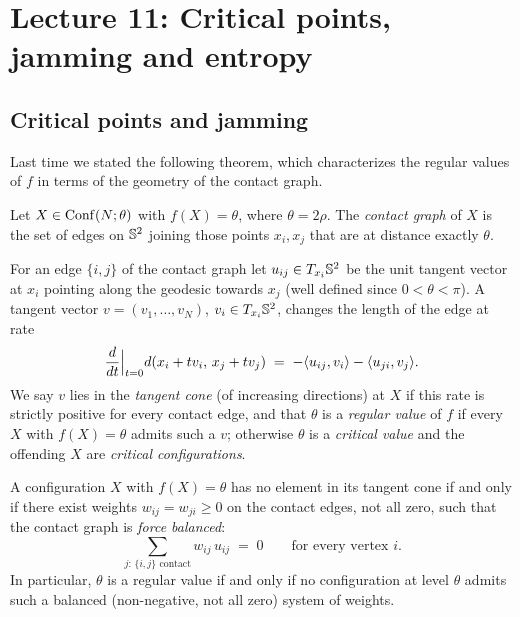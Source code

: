 \chapter{Lecture 11: Critical points, jamming and entropy}
\label{L11:ch}

\section{Critical points and jamming}
\label{L11:sec:critical}


Last time we stated the following theorem, which characterizes the regular values of $f$ in terms of the geometry of the contact graph.

\begin{definition}\label{L11:def:contact}
Let $X\in\operatorname{Conf}(N;\theta)$ with $f(X)=\theta$, where $\theta=2\rho$. The \emph{contact graph} of $X$ is the set of edges on $\mathbb{S}^2$  joining those points $x_i,x_j$ that are at distance exactly $\theta$.
\end{definition}

\begin{addedblock}
For an edge $\{i,j\}$ of the contact graph let $u_{ij}\in T_{x_i}\mathbb{S}^2$ be the unit tangent vector at $x_i$ pointing along the geodesic towards $x_j$ (well defined since $0<\theta<\pi$). A tangent vector $v=(v_1,\dots,v_N)$, $v_i\in T_{x_i}\mathbb{S}^2$, changes the length of the edge at rate
\[
\frac{d}{dt}\Big|_{t=0} d(x_i+tv_i,\,x_j+tv_j) \;=\; -\langle u_{ij}, v_i\rangle-\langle u_{ji}, v_j\rangle.
\]
We say $v$ lies in the \emph{tangent cone} (of increasing directions) at $X$ if this rate is strictly positive for every contact edge, and that $\theta$ is a \emph{regular value} of $f$ if every $X$ with $f(X)=\theta$ admits such a $v$; otherwise $\theta$ is a \emph{critical value} and the offending $X$ are \emph{critical configurations}.
\end{addedblock}

\begin{theorem}\label{L11:thm:forcebalance}
A configuration $X$ with $f(X)=\theta$ has no element in its tangent cone if and only if there exist weights $w_{ij}=w_{ji}\ge0$ on the contact edges, not all zero, such that the contact graph is \emph{force balanced}:
\[
\sum_{j:\,\{i,j\}\text{ contact}} w_{ij}\,u_{ij} \;=\; 0 \qquad\text{for every vertex } i.
\]
In particular, $\theta$ is a regular value if and only if no configuration at level $\theta$ admits such a balanced (non-negative, not all zero) system of weights.
\end{theorem}


